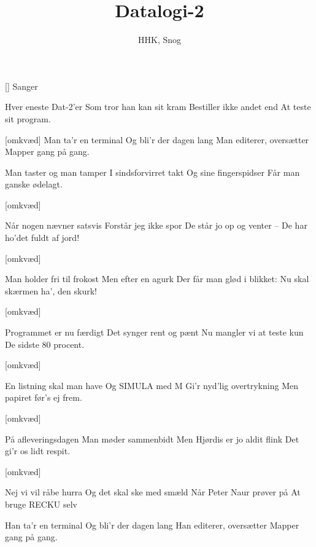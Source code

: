 \documentclass[a4paper,11pt]{article}
\title{Datalogi-2}
\author{HHK, Snog}
\begin{document}
\maketitle

\begin{roles}
[] Sanger
\end{roles}


\begin{song}
%
Hver eneste Dat-2'er
Som tror han kan sit kram
Bestiller ikke andet end
At teste sit program.

[omkvæd]%
Man ta'r en terminal
Og bli'r der dagen lang
Man editerer, oversætter
Mapper gang på gang.

%
Man taster og man tamper
I sindsforvirret takt
Og sine fingerspidser
Får man ganske ødelagt.

[omkvæd]

%
Når nogen nævner satsvis
Forstår jeg ikke spor
De står jo op og venter
-- De har ho'det fuldt af jord!

[omkvæd]

%
Man holder fri til frokost
Men efter en agurk
Der får man glød i blikket:
Nu skal skærmen ha', den skurk!

[omkvæd]

%
Programmet er nu færdigt
Det synger rent og pænt
Nu mangler vi at teste kun
De sidste 80 procent.

[omkvæd]

%
En listning skal man have
Og SIMULA med M
Gi'r nyd'lig overtrykning
Men papiret før's ej frem.

[omkvæd]

%
På afleveringsdagen
Man møder sammenbidt
Men Hjørdis er jo aldit flink
Det gi'r os lidt respit.

[omkvæd]

%
Nej vi vil råbe hurra
Og det skal ske med smæld
Når Peter Naur prøver på
At bruge RECKU selv

Han ta'r en terminal
Og bli'r der dagen lang
Han editerer, oversætter
Mapper gang på gang.
\end{song}
\end{document}
